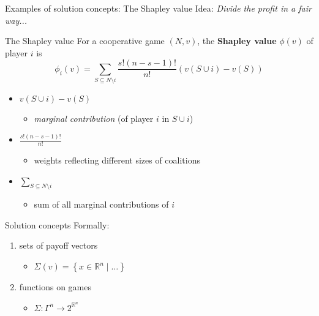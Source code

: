 \documentclass{beamer}
\newcommand{\Rn}[1][n]{\mathbb{R}^{#1}}
\begin{document}


\begin{frame}{Examples of solution concepts: The Shapley value}
    Idea: \textit{Divide the profit in a fair way...}
    \begin{block}{The Shapley value}
        For a cooperative game $(N,v)$, the \textbf{Shapley value} $\phi(v)$ of player $i$ is
        \[
        \phi_i(v) = \sum_{S \subseteq N \setminus i}\frac{s!(n-s-1)!}{n!}\left(v(S \cup i) - v(S)\right)
        \]
    \end{block}
    \begin{itemize}
        \item<2-> $v(S\cup i)-v(S)$
        \begin{itemize}
            \item<3-> \textit{marginal contribution} (of player $i$ in $S \cup i$)
        \end{itemize}
        \item<2-> $\frac{s!(n-s-1)!}{n!}$ 
        \begin{itemize}
            \item<4-> weights reflecting different sizes of coalitions
        \end{itemize}
        \item<2-> $\sum_{S \subseteq N \setminus i}$
        \begin{itemize}
            \item<5-> sum of all marginal contributions of $i$
        \end{itemize}
    \end{itemize}
\end{frame}



\begin{frame}{Solution concepts}
    Formally:
	\begin{enumerate}
	    \item<2-> sets of payoff vectors 
	    \begin{itemize}
	        \item<3-> $\Sigma(v) = \left\{x \in \Rn \mid \dots\right\}$
	    \end{itemize}
	    \item<2-> functions on games
	    \begin{itemize}
	        \item<4-> $\Sigma \colon \Gamma^n \to 2^{\Rn}$
	    \end{itemize}
	\end{enumerate}
\end{frame}
\end{document}
